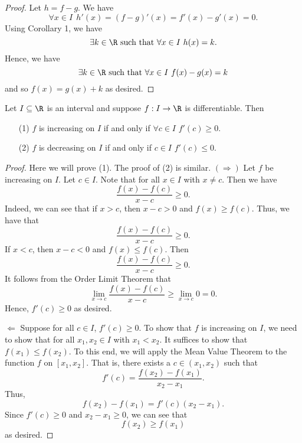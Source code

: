 \begin{proof}
Let \( h = f - g  \). We have 
\[  \forall x \in I \ \ h'(x) = (f - g )'(x) = f'(x) - g'(x) = 0.  \]
Using Corollary 1, we have  
\[  \exists k \in \R \ \text{such that} \ \forall x \in I \ h(x) = k.  \]
Hence, we have 
\[  \exists k \in \R \  \text{such that} \ \forall x \in I \ f(x) - g(x) = k  \]
and so \( f(x) = g(x) + k  \) as desired.
\end{proof}

\begin{theorem}
   Let \( I \subseteq \R   \) is an interval and suppose \( f : I \to \R  \) is differentiable. Then 
   \begin{enumerate}
       \item[(1)] \( f  \) is increasing on \( I  \) if and only if \( \forall c \in I  \) \( f'(c) \geq 0  \).
        \item[(2)] \( f  \) is decreasing on \( I  \) if and only if \( c \in I   \) \( f'(c) \leq 0  \).
   \end{enumerate}
\end{theorem}
\begin{proof}
Here we will prove (1). The proof of (2) is similar. 
\( (\Longrightarrow) \) Let \( f  \) be increasing on \( I  \). Let \( c \in I  \). Note that for all \( x \in I  \) with \( x \neq c  \). Then we have 
\[  \frac{ f(x) - f(c) }{ x - c  }  \geq 0.  \]
Indeed, we can see that if \( x > c  \), then \( x - c > 0  \) and \( f(x) \geq f(c) \). Thus, we have that 
\[  \frac{ f(x) - f(c) }{ x - c  }  \geq 0.  \]
If \( x < c  \), then \( x - c < 0  \) and \( f(x) \leq f(c) \). Then 
\[  \frac{ f(x) - f(c) }{ x -c  }  \geq 0. \]
It follows from the Order Limit Theorem that 
\[  \lim_{ x \to c  }  \frac{ f(x) - f(c) }{  x-  c  }  \geq \lim_{ x \to c  }  0  = 0. \]
Hence, \( f'(c) \geq 0 \) as desired.

\( \Longleftarrow \) Suppose for all \( c \in I  \), \( f'(c) \geq 0  \). To show that \( f  \) is increasing on \( I  \), we need to show that for all \( {x}_{1}, {x}_{2} \in I   \) with \( {x}_{1} < {x}_{2} \). It suffices to show that \( f({x}_{1}) \leq f({x}_{2}) \). To this end, we will apply the Mean Value Theorem to the function \( f  \) on \( [{x}_{1}, {x}_{2}] \). That is, there exists a \( c \in ({x}_{1}, {x}_{2}) \) such that 
\[  f'(c) = \frac{ f({x}_{2})- f({x}_{1}) }{  {x}_{2} - {x}_{1} }. \]
Thus, 
\[  f({x}_{2}) - f({x}_{1}) = f'(c) ({x}_{2} - {x}_{1}). \]
Since \( f'(c) \geq 0  \) and \( {x}_{2} - {x}_{1} \geq 0  \), we can see that 
\[  f({x}_{2}) \geq f({x}_{1}) \]
as desired.
\end{proof}

